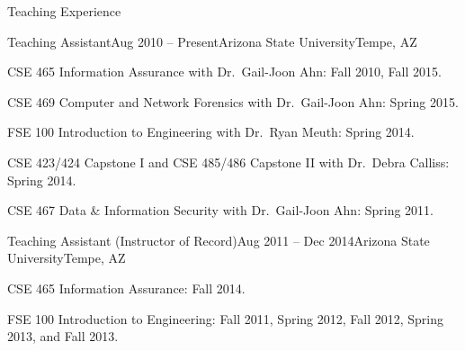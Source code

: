 \begin{rSection}{Teaching Experience}

  \begin{rExperienceBullets}{Teaching Assistant}{Aug 2010 -- Present}{Arizona State University}{Tempe, AZ}

    \item CSE 465 Information Assurance with Dr.\ Gail-Joon Ahn: Fall 2010, Fall 2015.

    \item CSE 469 Computer and Network Forensics with Dr.\ Gail-Joon Ahn: Spring 2015.

    \item FSE 100 Introduction to Engineering with Dr.\ Ryan Meuth: Spring 2014.

    \item CSE 423/424 Capstone I and CSE 485/486 Capstone II with Dr.\ Debra Calliss: Spring 2014.

    \item CSE 467 Data \& Information Security with Dr.\ Gail-Joon Ahn: Spring 2011.

  \end{rExperienceBullets}

  \begin{rExperienceBullets}{Teaching Assistant (Instructor of Record)}{Aug 2011 -- Dec 2014}{Arizona State University}{Tempe, AZ}

    \item CSE 465 Information Assurance: Fall 2014.

    \item FSE 100 Introduction to Engineering: Fall 2011, Spring 2012, Fall 2012, Spring 2013, and Fall 2013.

  \end{rExperienceBullets}

\end{rSection}
